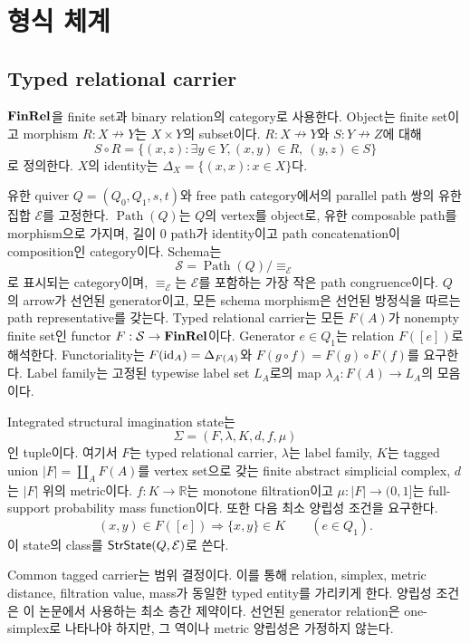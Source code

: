 \section{형식 체계}

\subsection{Typed relational carrier}

$\mathbf{FinRel}$을 finite set과 binary relation의 category로 사용한다. Object는 finite
set이고 morphism $R:X\nrightarrow Y$는 $X\times Y$의 subset이다. $R:X\nrightarrow Y$와
$S:Y\nrightarrow Z$에 대해
\[
S\circ R=\{(x,z):\exists y\in Y,
(x,y)\in R,\ (y,z)\in S\}
\]
로 정의한다. $X$의 identity는 $\Delta_X=\{(x,x):x\in X\}$다.

유한 quiver $Q=(Q_0,Q_1,s,t)$와 free path category에서의 parallel path 쌍의
유한 집합 $\mathcal E$를 고정한다. $\operatorname{Path}(Q)$는 $Q$의 vertex를
object로, 유한 composable path를 morphism으로 가지며, 길이 0 path가 identity이고
path concatenation이 composition인 category이다. Schema는
\[
\mathcal S=\operatorname{Path}(Q)/\!\equiv_{\mathcal E}
\]
로 표시되는 category이며, $\equiv_{\mathcal E}$는 $\mathcal E$를 포함하는
가장 작은 path congruence이다. $Q$의 arrow가 선언된 generator이고, 모든
schema morphism은 선언된 방정식을 따르는 path representative를 갖는다.
Typed relational carrier는 모든 $F(A)$가 nonempty finite set인 functor
$F:\mathcal S\to\mathbf{FinRel}$이다. Generator $e\in Q_1$는 relation $F([e])$로
해석한다. Functoriality는 $F(\mathrm{id}_A)=\Delta_{F(A)}$와
$F(g\circ f)=F(g)\circ F(f)$를 요구한다. Label family는 고정된 typewise
label set $L_A$로의 map $\lambda_A:F(A)\to L_A$의 모음이다.

\begin{definition}
Integrated structural imagination state는
\[
\Sigma=(F,\lambda,K,d,f,\mu)
\]
인 tuple이다. 여기서 $F$는 typed relational carrier, $\lambda$는 label family,
$K$는 tagged union $|F|=\coprod_A F(A)$를 vertex set으로 갖는 finite abstract
simplicial complex, $d$는 $|F|$ 위의 metric이다. $f:K\to\mathbb R$는 monotone
filtration이고 $\mu:|F|\to(0,1]$는 full-support probability mass function이다.
또한 다음 최소 양립성 조건을 요구한다.
\[
(x,y)\in F([e])\Longrightarrow\{x,y\}\in K\qquad(e\in Q_1).
\]
이 state의 class를 $\mathsf{StrState}(Q,\mathcal E)$로 쓴다.
\end{definition}

Common tagged carrier는 범위 결정이다. 이를 통해 relation, simplex, metric
distance, filtration value, mass가 동일한 typed entity를 가리키게 한다. 양립성
조건은 이 논문에서 사용하는 최소 층간 제약이다. 선언된 generator relation은
one-simplex로 나타나야 하지만, 그 역이나 metric 양립성은 가정하지 않는다.

